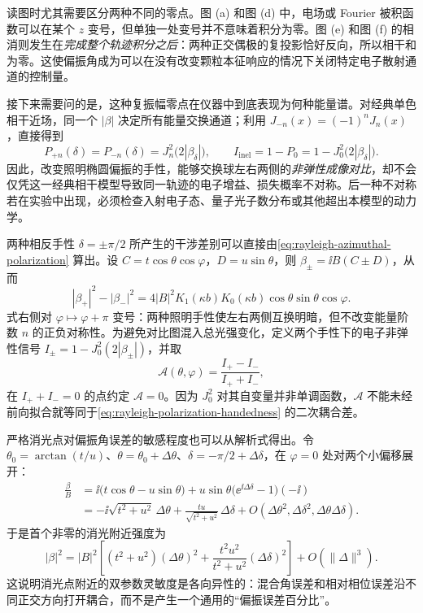 读图时尤其需要区分两种不同的零点。图 (a) 和图 (d) 中，电场或 Fourier 被积函数可以在某个 $z$ 变号，但单独一处变号并不意味着积分为零。图 (e) 和图 (f) 的相消则发生在\emph{完成整个轨迹积分之后}：两种正交偶极的复投影恰好反向，所以相干和为零。这使偏振角成为可以在没有改变颗粒本征响应的情况下关闭特定电子散射通道的控制量。

接下来需要问的是，这种复振幅零点在仪器中到底表现为何种能量谱。对经典单色相干近场，同一个 $|\beta|$ 决定所有能量交换通道；利用 $J_{-n}(x)=(-1)^nJ_n(x)$，直接得到
\begin{equation}
 P_{+n}(\delta)=P_{-n}(\delta)=J_n^2\bigl(2|\beta_\delta|\bigr),\qquad
 I_{\mathrm{inel}}=1-P_0=1-J_0^2\bigl(2|\beta_\delta|\bigr).
 \label{eq:rayleigh-polarization-sidebands}
\end{equation}
因此，改变照明椭圆偏振的手性，能够交换球左右两侧的\emph{非弹性成像对比}，却不会仅凭这一经典相干模型导致同一轨迹的电子增益、损失概率不对称。后一种不对称若在实验中出现，必须检查入射电子态、量子光子数分布或其他超出本模型的动力学。

两种相反手性 $\delta=\pm\pi/2$ 所产生的干涉差别可以直接由\cref{eq:rayleigh-azimuthal-polarization} 算出。设 $C=t\cos\theta\cos\varphi$，$D=u\sin\theta$，则 $\beta_\pm=\ii B(C\pm D)$，从而
\begin{equation}
 |\beta_+|^2-|\beta_-|^2
 =4|B|^2K_1(\kappa b)K_0(\kappa b)
 \cos\theta\sin\theta\cos\varphi.
 \label{eq:rayleigh-polarization-handedness}
\end{equation}
式右侧对 $\varphi\mapsto\varphi+\pi$ 变号：两种照明手性使左右两侧互换明暗，但不改变能量阶数 $n$ 的正负对称性。为避免对比图混入总光强变化，定义两个手性下的电子非弹性信号 $I_\pm=1-J_0^2(2|\beta_\pm|)$，并取
\begin{equation}
 \mathcal A(\theta,\varphi)=\frac{I_+-I_-}{I_++I_-},
 \label{eq:rayleigh-polarization-asymmetry}
\end{equation}
在 $I_++I_-=0$ 的点约定 $\mathcal A=0$。因为 $J_0^2$ 对其自变量并非单调函数，$\mathcal A$ 不能未经前向拟合就等同于\cref{eq:rayleigh-polarization-handedness} 的二次耦合差。

严格消光点对偏振角误差的敏感程度也可以从解析式得出。令 $\theta_0=\arctan(t/u)$、$\theta=\theta_0+\Delta\theta$、$\delta=-\pi/2+\Delta\delta$，在 $\varphi=0$ 处对两个小偏移展开：
\begin{align*}
 \frac{\beta}{B}
 &=\ii\bigl(t\cos\theta-u\sin\theta\bigr)
 +u\sin\theta\bigl(\ee^{\ii\Delta\delta}-1\bigr)(-\ii)\\
 &=-\ii\sqrt{t^2+u^2}\,\Delta\theta
 +\frac{tu}{\sqrt{t^2+u^2}}\,\Delta\delta
 +O(\Delta\theta^2,\Delta\delta^2,\Delta\theta\Delta\delta).
\end{align*}
于是首个非零的消光附近强度为
\begin{equation}
 |\beta|^2=|B|^2\left[(t^2+u^2)(\Delta\theta)^2
 +\frac{t^2u^2}{t^2+u^2}(\Delta\delta)^2\right]
 +O(\|\Delta\|^3).
 \label{eq:rayleigh-polarization-null-curvature}
\end{equation}
这说明消光点附近的双参数灵敏度是各向异性的：混合角误差和相对相位误差沿不同正交方向打开耦合，而不是产生一个通用的“偏振误差百分比”。

